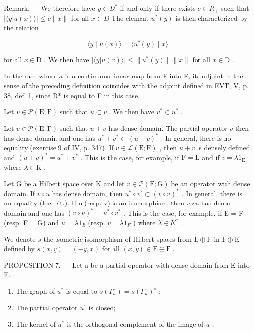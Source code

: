 Remark. --- We therefore have \(y \in D^{*}\) if and only if there exists \(c \in R_{+}\) such that \(|\langle y | u(x) \rangle| \leqslant c \|x\|\) for all \(x \in D\) The element \(u^{*}(y)\) is then characterized by the relation

\[
\langle y \mid u (x) \rangle = \langle u ^ {*} (y) \mid x \rangle\tag{1}
\]

for all \(x \in \mathrm{D}\) . We then have \(|\langle y | u(x) \rangle| \leqslant \| u^{*}(y) \| \| x \|\) for all \(x \in \mathrm{D}\) .

In the case where \(u\) is a continuous linear map from E into F, its adjoint in the sense of the preceding definition coincides with the adjoint defined in EVT, V, p. 38, def. 1, since D* is equal to F in this case.

Let \(v \in \mathcal{P}(\mathrm{E};\mathrm{F})\) such that \(u \subset v\) . We then have \(v^{*} \subset u^{*}\) .

Let \(v \in \mathcal{P}(\mathrm{E};\mathrm{F})\) such that \(u + v\) has dense domain. The partial operator \(v\) then has dense domain and one has \(u^{*} + v^{*} \subset (u + v)^{*}\) . In general, there is no equality (exercise 9 of IV, p. 347). If \(v \in \mathcal{L}(\mathrm{E};\mathrm{F})\) , then \(u + v\) is densely defined and \((u + v)^{*} = u^{*} + v^{*}\) . This is the case, for example, if \(\mathrm{F} = \mathrm{E}\) and if \(v = \lambda 1_{\mathrm{E}}\) where \(\lambda \in \mathrm{K}\) .

Let G be a Hilbert space over K and let \(v \in \mathcal{P}(\mathrm{F};\mathrm{G})\) be an operator with dense domain. If \(v \circ u\) has dense domain, then \(u^{*} \circ v^{*} \subset (v \circ u)^{*}\) . In general, there is no equality (loc. cit.). If u (resp. v) is an isomorphism, then \(v \circ u\) has dense domain and one has \((v \circ u)^{*} = u^{*} \circ v^{*}\) . This is the case, for example, if E = F (resp. F = G) and \(u = \lambda 1_{E}\) (resp. \(v = \lambda 1_{F}\) ) where \(\lambda \in K^{*}\) .

We denote \(s\) the isometric isomorphism of Hilbert spaces from \(\mathrm{E} \oplus \mathrm{F}\) in \(\mathrm{F} \oplus \mathrm{E}\) defined by \(s(x, y) = (-y, x)\) for all \((x, y) \in \mathrm{E} \oplus \mathrm{F}\) .

PROPOSITION 7. --- Let u be a partial operator with dense domain from E into F.

\begin{enumerate}
\def\labelenumi{\alph{enumi})}
\item
  The graph of \(u^{*}\) is equal to \(s(\Gamma_{u}^{\circ}) = s(\Gamma_{u})^{\circ}\) ;
\item
  The partial operator \(u^{*}\) is closed;
\item
  The kernel of \(u^{*}\) is the orthogonal complement of the image of \(u\) .
\end{enumerate}

